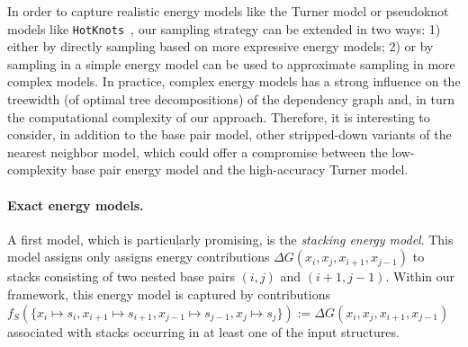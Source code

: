 \documentclass[]{bmcart}
\newcommand{\val}{\bar S} %
\newcommand{\Def}[1]{\emph{#1}}
\newcommand{\evalfor}[2]{#1(#2)}
\newcommand{\citep}[1]{\cite{#1}}
\begin{document}

In order to capture realistic energy models like the Turner model or pseudoknot models like {\tt HotKnots}~\citep{Ren2005}, our sampling strategy can be extended in two ways: 1) either by directly sampling based on more expressive energy models; 2) or by sampling in a simple energy model can be used to approximate sampling in more complex models.  In practice, complex energy models has a strong influence on the treewidth (of optimal tree decompositions) of the dependency graph and, in turn the computational complexity of our approach. Therefore, it is interesting to consider, in addition to the base pair model, other
stripped-down variants of the nearest neighbor model, which could offer a compromise between the low-complexity base pair energy model and the high-accuracy Turner model. 


\paragraph{Exact energy models.}
A first model, which is particularly promising, is the
\Def{stacking energy model}. This model assigns only assigns energy
contributions $\Delta G(x_i,x_j,x_{i+1},x_{j-1})$ to stacks consisting of two nested base pairs $(i,j)$ and $(i+1,j-1)$. Within our framework, this energy model is captured by contributions $f_S(\{x_i\mapsto s_i, x_{i+1}\mapsto s_{i+1}, x_{j-1}\mapsto s_{j-1}, x_{j}\mapsto s_{j}\}):=\Delta G(x_i,x_j,x_{i+1},x_{j-1})$ associated with stacks occurring in at least one of the input structures.
\end{document}
